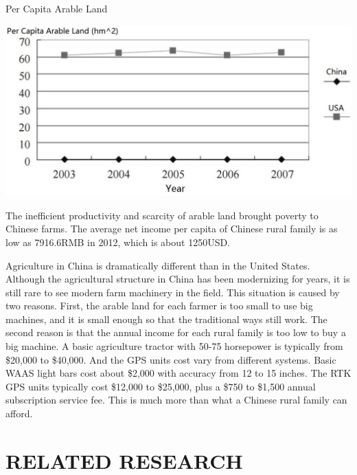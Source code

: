 \documentclass[letterpaper,12pt,oneside]{book}
\begin{document}
		\begin{table}[ht!]
			\begin{center}
				\caption{Per Capita Arable Land}
				\includegraphics[scale = 0.4]{capitahm2.jpg}
				\end{center}
		\end{table}
		The inefficient productivity and scarcity of arable land brought poverty to Chinese farms. The average net income per capita of Chinese rural family is as low as 7916.6RMB in 2012, which is about 1250USD. \cite{income2012} 
		
		Agriculture in China is dramatically different than in the United States. Although the agricultural structure in China has been modernizing for years, it is still rare to see  modern farm machinery in the field. This situation is caused by two reasons. First, the arable land for each farmer is too small to use big machines, and it is small enough so that the traditional ways still work. The second reason is that the annual income for each rural family is too low to buy a big machine. A basic agriculture tractor with 50-75 horsepower is typically from \$20,000 to \$40,000.\cite{tractorcost} And the GPS units cost vary from different systems. Basic WAAS light bars cost about \$2,000 with accuracy from 12 to 15 inches. The RTK GPS units typically cost \$12,000 to \$25,000, plus a \$750 to \$1,500 annual subscription service fee.\cite{PriceR} This is much more than what a Chinese rural family can afford. 
		
		\chapter{RELATED RESEARCH}
		
\end{document}
